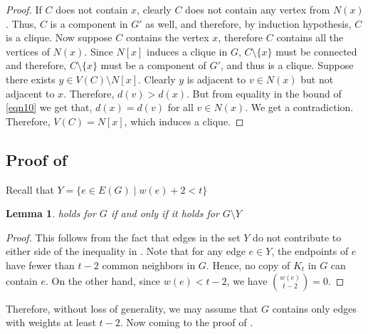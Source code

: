 \documentclass[pdflatex,sn-basic,Numbered]{sn-jnl}
\newtheorem{lemma}{Lemma}
\begin{document}
\begin{proof}
If $C$ does not contain $x$, clearly $C$ does not contain any vertex from $N(x)$. Thus, $C$ is a component in $G'$ as well, and therefore, by induction hypothesis, $C$ is a clique. Now suppose $C$ contains the vertex $x$, therefore $C$ contains all the vertices of $N(x)$. Since $N[x]$ induces a clique in $G$, $C\setminus \{x\}$ must be connected and therefore, $C\setminus \{x\}$ must be a component of $G'$, and thus is a clique. Suppose there exists $y \in V(C) \setminus N[x]$. Clearly $y$ is adjacent to $v \in N(x)$ but not adjacent to $x$. Therefore, $d(v) > d(x)$. But from equality in the bound of \cref{eqn10} we get that, $d(x) = d(v)$ for all $v \in N(x)$. We get a contradiction. Therefore, $V(C) = N[x]$, which induces a clique.    \end{proof}
\subsection{Proof of }
 Recall that $Y = \{e\in E(G) \mid w(e) +2 < t\}$
\begin{lemma}\label{lem2}
 holds for $G$ if and only if it holds for $G\setminus Y$
\end{lemma} 
   \begin{proof}
This follows from the fact that edges in the set $Y$ do not contribute to either side of the inequality in . Note that for any edge $e \in Y$, the endpoints of $e$ have fewer than $t-2$ common neighbors in $G$. Hence, no copy of $K_t$ in $G$ can contain $e$. On the other hand, since $w(e) < t-2$, we have ${w(e) \choose t-2} = 0$. 
\end{proof}
Therefore, without loss of generality, we may assume that $G$ contains only edges with weights at least $t-2$. Now coming to the proof of .
\end{document}
